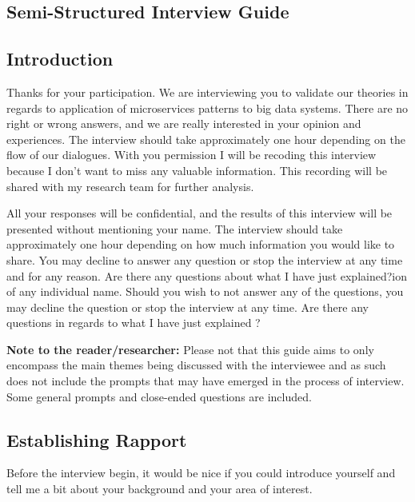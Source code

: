 \documentclass{bmcart}
\begin{document}
\begin{backmatter}

\section*{Semi-Structured Interview Guide} \label{interviewGuide}

\subsection*{Introduction}

Thanks for your participation. We are interviewing you to validate our theories in regards to application of microservices patterns to big data systems. There are no right or wrong answers, and we are really interested in your opinion and experiences. The interview should take approximately one hour depending on the flow of our dialogues. With you permission I will be recoding this interview because I don't want to miss any valuable information. This recording will be shared with my research team for further analysis. 

All your responses will be confidential, and the results of this interview will be presented without mentioning your name. The interview should take approximately one hour depending on how much information you would like to share. You may decline to answer any question or stop the interview at any time and for any reason. Are there any questions about what I have just explained?ion of any individual name. Should you wish to not answer any of the questions, you may decline the question or stop the interview at any time. Are there any questions in regards to what I have just explained ?

\hspace{2cm}

\textbf{Note to the reader/researcher:} Please not that this guide aims to only encompass the main themes being discussed with the interviewee and as such does not include the prompts that may have emerged in the process of interview. Some general prompts and close-ended questions are included.


\subsection*{\textbf{Establishing Rapport}}

Before the interview begin, it would be nice if you could introduce yourself and tell me a bit about your background and your area of interest. 


\end{backmatter}
\end{document}
